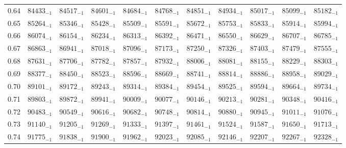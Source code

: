 \documentclass[10pt, a4paper]{article}
\begin{document}
\begin{center}
\begin{longtable}{c | c c c c c | c c c c c}
        0.64 & \({84433}_{-1}\) & \({84517}_{-1}\) & \({84601}_{-1}\) & \({84684}_{-1}\) & \({84768}_{-1}\) & \({84851}_{-1}\) & \({84934}_{-1}\) & \({85017}_{-1}\) & \({85099}_{-1}\) & \({85182}_{-1}\)\\
        0.65 & \({85264}_{-1}\) & \({85346}_{-1}\) & \({85428}_{-1}\) & \({85509}_{-1}\) & \({85591}_{-1}\) & \({85672}_{-1}\) & \({85753}_{-1}\) & \({85833}_{-1}\) & \({85914}_{-1}\) & \({85994}_{-1}\)\\
        0.66 & \({86074}_{-1}\) & \({86154}_{-1}\) & \({86234}_{-1}\) & \({86313}_{-1}\) & \({86392}_{-1}\) & \({86471}_{-1}\) & \({86550}_{-1}\) & \({86629}_{-1}\) & \({86707}_{-1}\) & \({86785}_{-1}\)\\
        0.67 & \({86863}_{-1}\) & \({86941}_{-1}\) & \({87018}_{-1}\) & \({87096}_{-1}\) & \({87173}_{-1}\) & \({87250}_{-1}\) & \({87326}_{-1}\) & \({87403}_{-1}\) & \({87479}_{-1}\) & \({87555}_{-1}\)\\
        0.68 & \({87631}_{-1}\) & \({87706}_{-1}\) & \({87782}_{-1}\) & \({87857}_{-1}\) & \({87932}_{-1}\) & \({88006}_{-1}\) & \({88081}_{-1}\) & \({88155}_{-1}\) & \({88229}_{-1}\) & \({88303}_{-1}\)\\
        0.69 & \({88377}_{-1}\) & \({88450}_{-1}\) & \({88523}_{-1}\) & \({88596}_{-1}\) & \({88669}_{-1}\) & \({88741}_{-1}\) & \({88814}_{-1}\) & \({88886}_{-1}\) & \({88958}_{-1}\) & \({89029}_{-1}\)\\
        0.70 & \({89101}_{-1}\) & \({89172}_{-1}\) & \({89243}_{-1}\) & \({89314}_{-1}\) & \({89384}_{-1}\) & \({89454}_{-1}\) & \({89525}_{-1}\) & \({89594}_{-1}\) & \({89664}_{-1}\) & \({89734}_{-1}\)\\
        0.71 & \({89803}_{-1}\) & \({89872}_{-1}\) & \({89941}_{-1}\) & \({90009}_{-1}\) & \({90077}_{-1}\) & \({90146}_{-1}\) & \({90213}_{-1}\) & \({90281}_{-1}\) & \({90348}_{-1}\) & \({90416}_{-1}\)\\
        0.72 & \({90483}_{-1}\) & \({90549}_{-1}\) & \({90616}_{-1}\) & \({90682}_{-1}\) & \({90748}_{-1}\) & \({90814}_{-1}\) & \({90880}_{-1}\) & \({90945}_{-1}\) & \({91011}_{-1}\) & \({91076}_{-1}\)\\
        0.73 & \({91140}_{-1}\) & \({91205}_{-1}\) & \({91269}_{-1}\) & \({91333}_{-1}\) & \({91397}_{-1}\) & \({91461}_{-1}\) & \({91524}_{-1}\) & \({91587}_{-1}\) & \({91650}_{-1}\) & \({91713}_{-1}\)\\
        0.74 & \({91775}_{-1}\) & \({91838}_{-1}\) & \({91900}_{-1}\) & \({91962}_{-1}\) & \({92023}_{-1}\) & \({92085}_{-1}\) & \({92146}_{-1}\) & \({92207}_{-1}\) & \({92267}_{-1}\) & \({92328}_{-1}\)\\

\end{longtable}
\end{center}
\end{document}
